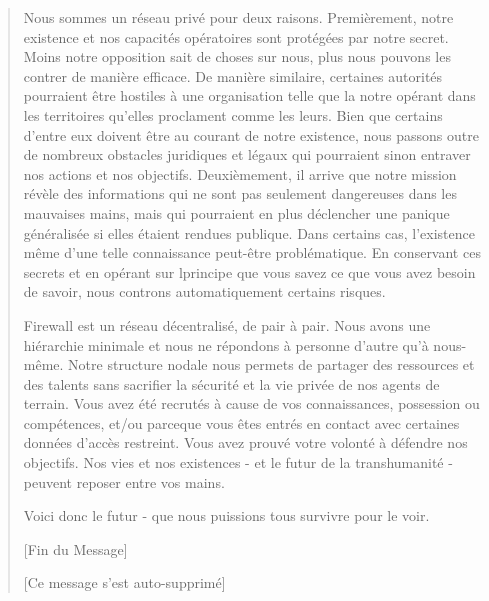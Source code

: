 \begin{quotation}
Nous sommes un réseau privé pour deux raisons. Premièrement, notre existence et nos capacités opératoires sont protégées par notre secret. Moins notre opposition sait de choses sur nous, plus nous pouvons les contrer de manière efficace. De manière similaire, certaines autorités pourraient être hostiles à une organisation telle que la notre opérant dans les territoires qu'elles proclament comme les leurs. Bien que certains d'entre eux doivent être au courant de notre existence, nous passons outre de nombreux obstacles juridiques et légaux qui pourraient sinon entraver nos actions et nos objectifs. Deuxièmement, il arrive que notre mission révèle des informations qui ne sont pas seulement dangereuses dans les mauvaises mains, mais qui pourraient en plus déclencher une panique généralisée si elles étaient rendues publique. Dans certains cas, l'existence même d'une telle connaissance peut-être problématique. En conservant ces secrets et en opérant sur lprincipe que vous savez ce que vous avez besoin de savoir, nous controns automatiquement certains risques. 

Firewall est un réseau décentralisé, de pair à pair. Nous avons une hiérarchie minimale et nous ne répondons à personne d'autre qu'à nous-même. Notre structure nodale nous permets de partager des ressources et des talents sans sacrifier la sécurité et la vie privée de nos agents de terrain. Vous avez été recrutés à cause de vos connaissances, possession ou compétences, et/ou parceque vous êtes entrés en contact avec certaines données d'accès restreint. Vous avez prouvé votre volonté à défendre nos objectifs. Nos vies et nos existences - et le futur de la transhumanité - peuvent reposer entre vos mains. 

Voici donc le futur - que nous puissions tous survivre pour le voir. 

[Fin du Message] 

[Ce message s'est auto-supprimé] 

\end{quotation} 

